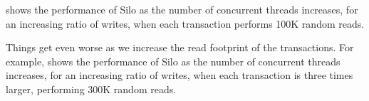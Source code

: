  shows the performance of Silo as the number of concurrent threads increases, for an increasing ratio of writes, when each transaction performs 100K random reads.

Things get even worse as we increase the read footprint of the transactions. For example,  shows the performance of Silo as the number of concurrent threads increases, for an increasing ratio of writes, when each transaction is three times larger, performing 300K random reads.




